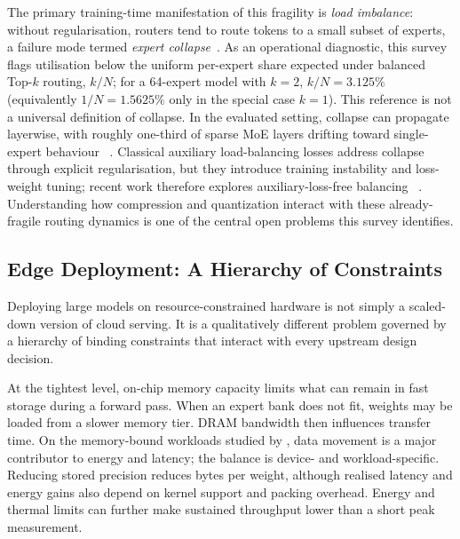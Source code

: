 \documentclass[10pt]{article}
\begin{document}
The primary training-time manifestation of this fragility is \emph{load imbalance}:
without regularisation, routers tend to route tokens to a small subset of experts, a
failure mode termed \emph{expert collapse}~\citep{sha2026sparsemixtureofexpertsroutingvisual,do2026eigenvectorsexpertstrainingfreenoncollapsing}.
As an operational diagnostic, this survey flags utilisation below the uniform
per-expert share expected under balanced Top-$k$ routing, $k/N$; for a 64-expert
model with $k=2$, $k/N=3.125\%$ (equivalently $1/N=1.5625\%$ only in the
special case $k=1$).  This reference is not a universal definition of collapse. In the evaluated setting, collapse can propagate layerwise,
with roughly one-third of sparse MoE layers drifting toward single-expert behaviour
~\citep{sha2026sparsemixtureofexpertsroutingvisual}.  Classical auxiliary load-balancing losses address collapse
through explicit regularisation, but they introduce training instability and
loss-weight tuning; recent work therefore explores auxiliary-loss-free balancing
~\citep{wang2024auxiliarylossfreeloadbalancingstrategy}.  Understanding how compression and quantization interact with
these already-fragile routing dynamics is one of the central open problems this survey
identifies.

\subsection{Edge Deployment: A Hierarchy of Constraints}

Deploying large models on resource-constrained hardware is not simply a scaled-down
version of cloud serving.  It is a qualitatively different problem governed by a
hierarchy of binding constraints that interact with every upstream design decision.

At the tightest level, on-chip memory capacity limits what can remain in fast storage
during a forward pass.  When an expert bank does not fit, weights may be loaded from a
slower memory tier.  DRAM bandwidth then influences transfer time.  On the memory-bound
workloads studied by \citet{chung2026joulesgodiagnosinginference}, data movement is a
major contributor to energy and latency; the balance is device- and workload-specific.
Reducing stored precision reduces bytes per weight, although realised latency and
energy gains also depend on kernel support and packing overhead.  Energy and thermal
limits can further make sustained throughput lower than a short peak measurement.
\end{document}
